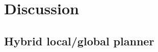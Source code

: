 \section{Discussion}

















































\subsection{Hybrid local/global planner}




